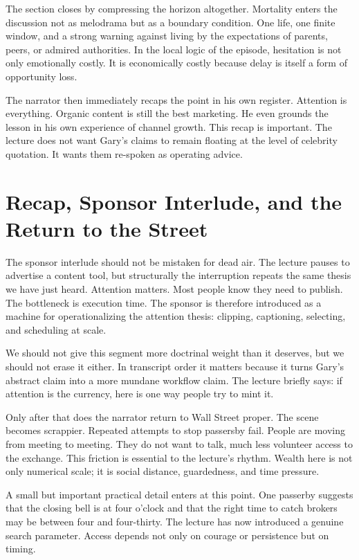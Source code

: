 The section closes by compressing the horizon altogether. Mortality enters the discussion not as melodrama but as a boundary condition. One life, one finite window, and a strong warning against living by the expectations of parents, peers, or admired authorities. In the local logic of the episode, hesitation is not only emotionally costly. It is economically costly because delay is itself a form of opportunity loss.

The narrator then immediately recaps the point in his own register. Attention is everything. Organic content is still the best marketing. He even grounds the lesson in his own experience of channel growth. This recap is important. The lecture does not want Gary's claims to remain floating at the level of celebrity quotation. It wants them re-spoken as operating advice.

\section{Recap, Sponsor Interlude, and the Return to the Street}

The sponsor interlude should not be mistaken for dead air. The lecture pauses to advertise a content tool, but structurally the interruption repeats the same thesis we have just heard. Attention matters. Most people know they need to publish. The bottleneck is execution time. The sponsor is therefore introduced as a machine for operationalizing the attention thesis: clipping, captioning, selecting, and scheduling at scale.

We should not give this segment more doctrinal weight than it deserves, but we should not erase it either. In transcript order it matters because it turns Gary's abstract claim into a more mundane workflow claim. The lecture briefly says: if attention is the currency, here is one way people try to mint it.

Only after that does the narrator return to Wall Street proper. The scene becomes scrappier. Repeated attempts to stop passersby fail. People are moving from meeting to meeting. They do not want to talk, much less volunteer access to the exchange. This friction is essential to the lecture's rhythm. Wealth here is not only numerical scale; it is social distance, guardedness, and time pressure.

A small but important practical detail enters at this point. One passerby suggests that the closing bell is at four o'clock and that the right time to catch brokers may be between four and four-thirty. The lecture has now introduced a genuine search parameter. Access depends not only on courage or persistence but on timing.

